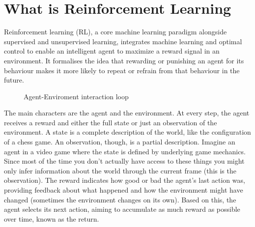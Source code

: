 \section{What is Reinforcement Learning}
Reinforcement learning (RL), a core machine learning paradigm alongside supervised and unsupervised learning, 
integrates machine learning and optimal control to enable an intelligent agent to maximize a reward signal in 
an environment. It formalises the idea that rewarding or punishing an agent for its behaviour makes it more 
likely to repeat or refrain from that behaviour in the future.
\begin{figure}[h!]
\centering
{}
\caption{Agent-Enviroment interaction loop}
\label{fig:rl loop}
\end{figure}

The main characters are the agent and the environment. At every step, the agent receives a reward and either the 
full state or just an observation of the environment. A state is a complete description of the world, like the 
configuration of a chess game. An observation, though, is a partial description. Imagine an agent in a video 
game where the state is defined by underlying game mechanics. Since most of the time you don't actually have access to 
these things you might only infer information about the world through the current frame (this is the observation).\newline 
The reward indicates how good or bad the agent’s last action was, providing feedback 
about what happened and how the environment might have changed (sometimes the environment changes on its own). 
Based on this, the agent selects its next action, aiming to accumulate as much reward as possible over time, 
known as the return.